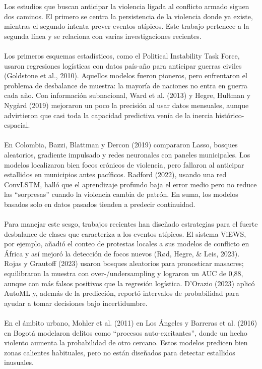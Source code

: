 Los estudios que buscan anticipar la violencia ligada al conflicto armado siguen dos caminos. El primero se centra la persistencia de la violencia donde ya existe, mientras el segundo intenta prever eventos atípicos. Este trabajo pertenece a la segunda línea y se relaciona con varias investigaciones recientes.
\\\\
Los primeros esquemas estadísticos, como el Political Instability Task Force, usaron regresiones logísticas con datos país-año para anticipar guerras civiles (Goldstone et al., 2010). Aquellos modelos fueron pioneros, pero enfrentaron el problema de desbalance de muestra: la mayoría de naciones no entra en guerra cada año. Con información subnacional, Ward et al. (2013) y Hegre, Hultman y Nygård (2019) mejoraron un poco la precisión al usar datos mensuales, aunque advirtieron que casi toda la capacidad predictiva venía de la inercia histórico-espacial.
\\\\
En Colombia, Bazzi, Blattman y Dercon (2019) compararon Lasso, bosques aleatorios, gradiente impulsado y redes neuronales con paneles municipales. Los modelos localizaron bien focos crónicos de violencia, pero fallaron al anticipar estallidos en municipios antes pacíficos. Radford (2022), usando una red ConvLSTM, halló que el aprendizaje profundo baja el error medio pero no reduce las “sorpresas” cuando la violencia cambia de patrón. En suma, los modelos basados solo en datos pasados tienden a predecir continuidad.
\\\\
Para manejar este sesgo, trabajos recientes han diseñado estrategias para el fuerte desbalance de clases que caracteriza a los eventos atípicos. El sistema ViEWS, por ejemplo, añadió el conteo de protestas locales a sus modelos de conflicto en África y así mejoró la detección de focos nuevos (Rød, Hegre, & Leis, 2023). Rojas y Grautoff (2023) usaron bosques aleatorios para pronosticar masacres; equilibraron la muestra con over-/undersampling y lograron un AUC de 0,88, aunque con más falsos positivos que la regresión logística. D’Orazio (2023) aplicó AutoML y, además de la predicción, reportó intervalos de probabilidad para ayudar a tomar decisiones bajo incertidumbre.
\\\\
En el ámbito urbano, Mohler et al. (2011) en Los Ángeles y Barreras et al. (2016) en Bogotá modelaron delitos como “procesos auto-excitantes”, donde un hecho violento aumenta la probabilidad de otro cercano. Estos modelos predicen bien zonas calientes habituales, pero no están diseñados para detectar estallidos inusuales.
